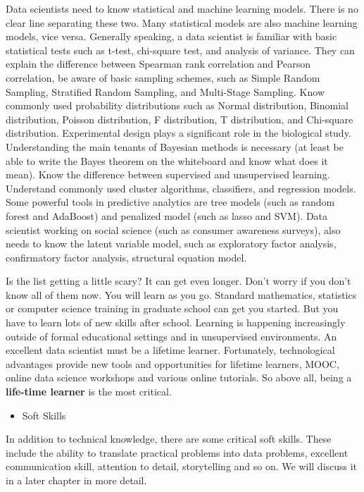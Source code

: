 \documentclass[12pt,]{krantz}
\providecommand{\tightlist}{%
  \setlength{\itemsep}{0pt}\setlength{\parskip}{0pt}}
\theoremstyle{definition}
\theoremstyle{definition}
\theoremstyle{remark}
\begin{document}
Data scientists need to know statistical and machine learning models.
There is no clear line separating these two. Many statistical models are
also machine learning models, vice versa. Generally speaking, a data
scientist is familiar with basic statistical tests such as t-test,
chi-square test, and analysis of variance. They can explain the
difference between Spearman rank correlation and Pearson correlation, be
aware of basic sampling schemes, such as Simple Random Sampling,
Stratified Random Sampling, and Multi-Stage Sampling. Know commonly used
probability distributions such as Normal distribution, Binomial
distribution, Poisson distribution, F distribution, T distribution, and
Chi-square distribution. Experimental design plays a significant role in
the biological study. Understanding the main tenants of Bayesian methods
is necessary (at least be able to write the Bayes theorem on the
whiteboard and know what does it mean). Know the difference between
supervised and unsupervised learning. Understand commonly used cluster
algorithms, classifiers, and regression models. Some powerful tools in
predictive analytics are tree models (such as random forest and
AdaBoost) and penalized model (such as lasso and SVM). Data scientist
working on social science (such as consumer awareness surveys), also
needs to know the latent variable model, such as exploratory factor
analysis, confirmatory factor analysis, structural equation model.

Is the list getting a little scary? It can get even longer. Don't worry
if you don't know all of them now. You will learn as you go. Standard
mathematics, statistics or computer science training in graduate school
can get you started. But you have to learn lots of new skills after
school. Learning is happening increasingly outside of formal educational
settings and in unsupervised environments. An excellent data scientist
must be a lifetime learner. Fortunately, technological advantages
provide new tools and opportunities for lifetime learners, MOOC, online
data science workshops and various online tutorials. So above all, being
a \textbf{life-time learner} is the most critical.

\begin{itemize}
\tightlist
\item
  Soft Skills
\end{itemize}

In addition to technical knowledge, there are some critical soft skills.
These include the ability to translate practical problems into data
problems, excellent communication skill, attention to detail,
storytelling and so on. We will discuss it in a later chapter in more
detail.
\end{document}
